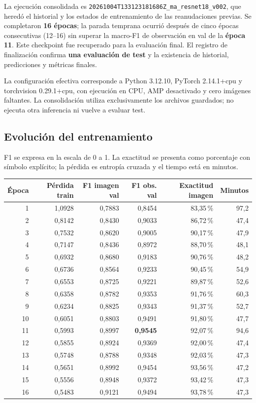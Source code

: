 \documentclass[11pt,a4paper]{article}
\newcommand{\archivo}[1]{\nolinkurl{#1}}
\begin{document}
La ejecución consolidada es \archivo{20261004T133123181686Z_ma_resnet18_v002},
que heredó el historial y los estados de entrenamiento de las reanudaciones previas.
Se completaron \textbf{16 épocas}; la parada temprana ocurrió después de cinco
épocas consecutivas (12--16) sin superar la macro-F1 de observación en val
de la \textbf{época 11}. Este checkpoint fue recuperado para la evaluación final.
El registro de finalización confirma \textbf{una evaluación de test} y la
existencia de historial, predicciones y métricas finales.

La configuración efectiva corresponde a Python 3.12.10, PyTorch 2.14.1+cpu
y torchvision 0.29.1+cpu, con ejecución en CPU, AMP desactivado y cero
imágenes faltantes. La consolidación utiliza exclusivamente los archivos
guardados; no ejecuta otra inferencia ni vuelve a evaluar test.

\subsection{Evolución del entrenamiento}

F1 se expresa en la escala de 0 a 1. La exactitud se presenta como porcentaje
con símbolo explícito; la pérdida es entropía cruzada y el tiempo está en minutos.
\begin{center}\small
\begin{tabular}{rrrrrr}
\toprule
\textbf{Época} & \textbf{Pérdida train} & \textbf{F1 imagen val} & \textbf{F1 obs. val} & \textbf{Exactitud imagen} & \textbf{Minutos}\\
\midrule
1 & 1,0928 & 0,7883 & 0,8454 & 83,35\,\% & 97,2\\
2 & 0,8142 & 0,8430 & 0,9033 & 86,72\,\% & 47,4\\
3 & 0,7532 & 0,8620 & 0,9005 & 90,17\,\% & 47,9\\
4 & 0,7147 & 0,8436 & 0,8972 & 88,70\,\% & 48,1\\
5 & 0,6932 & 0,8680 & 0,9183 & 90,76\,\% & 48,2\\
6 & 0,6736 & 0,8564 & 0,9233 & 90,45\,\% & 54,9\\
7 & 0,6553 & 0,8725 & 0,9221 & 89,87\,\% & 52,6\\
8 & 0,6358 & 0,8782 & 0,9353 & 91,76\,\% & 60,3\\
9 & 0,6234 & 0,8825 & 0,9343 & 91,37\,\% & 52,7\\
10 & 0,6051 & 0,8803 & 0,9491 & 91,80\,\% & 47,7\\
11 & 0,5993 & 0,8997 & \textbf{0,9545} & 92,07\,\% & 94,6\\
12 & 0,5855 & 0,8924 & 0,9369 & 92,00\,\% & 47,4\\
13 & 0,5748 & 0,8788 & 0,9348 & 92,03\,\% & 47,3\\
14 & 0,5651 & 0,8992 & 0,9454 & 93,56\,\% & 47,2\\
15 & 0,5556 & 0,8948 & 0,9372 & 93,42\,\% & 47,3\\
16 & 0,5483 & 0,9121 & 0,9494 & 93,78\,\% & 47,3\\
\bottomrule\end{tabular}\end{center}
\end{document}
